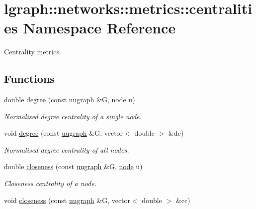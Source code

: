 \hypertarget{namespacelgraph_1_1networks_1_1metrics_1_1centralities}{}\section{lgraph\+:\+:networks\+:\+:metrics\+:\+:centralities Namespace Reference}
\label{namespacelgraph_1_1networks_1_1metrics_1_1centralities}


Centrality metrics.  


\subsection*{Functions}
\begin{DoxyCompactItemize}
\item 
double \hyperlink{namespacelgraph_1_1networks_1_1metrics_1_1centralities_a587a7cd32f7d59138fd7a327c902b4ab}{degree} (const \hyperlink{classlgraph_1_1utils_1_1uugraph}{uugraph} \&G, \hyperlink{namespacelgraph_1_1utils_ab9c6b34241f0b68372c55f34c460e863}{node} u)
\begin{DoxyCompactList}\small\item\em Normalised degree centrality of a single node. \end{DoxyCompactList}\item 
void \hyperlink{namespacelgraph_1_1networks_1_1metrics_1_1centralities_a550503d0a4429f9eb993d6a739130853}{degree} (const \hyperlink{classlgraph_1_1utils_1_1uugraph}{uugraph} \&G, vector$<$ double $>$ \&dc)
\begin{DoxyCompactList}\small\item\em Normalised degree centrality of all nodes. \end{DoxyCompactList}\item 
double \hyperlink{namespacelgraph_1_1networks_1_1metrics_1_1centralities_a93bddce29621b2d88b633971bcf0ba3c}{closeness} (const \hyperlink{classlgraph_1_1utils_1_1uugraph}{uugraph} \&G, \hyperlink{namespacelgraph_1_1utils_ab9c6b34241f0b68372c55f34c460e863}{node} u)
\begin{DoxyCompactList}\small\item\em Closeness centrality of a node. \end{DoxyCompactList}\item 
void \hyperlink{namespacelgraph_1_1networks_1_1metrics_1_1centralities_a7405d3e9a93d0b4d8c1898e2456acea9}{closeness} (const \hyperlink{classlgraph_1_1utils_1_1uugraph}{uugraph} \&G, vector$<$ double $>$ \&cc)

\end{DoxyCompactItemize}
